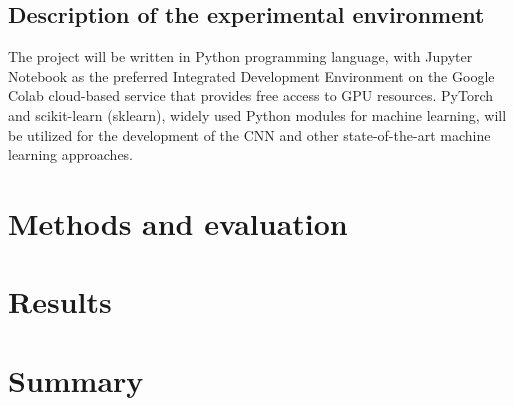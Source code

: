 \documentclass[runningheads]{llncs}
\begin{document}
\subsection{Description of the experimental environment}
The project will be written in Python programming language, with Jupyter Notebook as the preferred Integrated Development Environment on the Google Colab cloud-based service that provides free access to GPU resources. PyTorch and scikit-learn (sklearn), widely used Python modules for machine learning, will be utilized for the development of the CNN and other state-of-the-art machine learning approaches.

\section{Methods and evaluation}

\section{Results}

\section{Summary}


%
%
%
% 
% 

\end{document}
